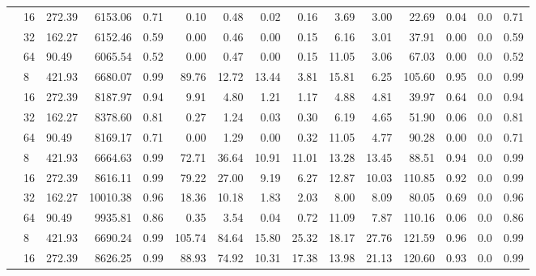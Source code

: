 \begin{table}
\begin{adjustwidth}{-1cm}{}
{\begin{tabular}{lllrrrrrrrrrrrr}
                                 & 16 & 272.39 & 6153.06   & 0.71   & 0.10   & 0.48   & 0.02  & 0.16  & 3.69  & 3.00  & 22.69           & 0.04      & 0.0   & 0.71 \\
                                 & 32 & 162.27 & 6152.46   & 0.59   & 0.00   & 0.46   & 0.00  & 0.15  & 6.16  & 3.01  & 37.91           & 0.00      & 0.0   & 0.59 \\
                                 & 64 & 90.49  & 6065.54   & 0.52   & 0.00   & 0.47   & 0.00  & 0.15  & 11.05 & 3.06  & 67.03           & 0.00      & 0.0   & 0.52 \\
                        \addlinespace
                        48       & 8  & 421.93 & 6680.07   & 0.99   & 89.76  & 12.72  & 13.44 & 3.81  & 15.81 & 6.25  & 105.60          & 0.95      & 0.0   & 0.99 \\
                                 & 16 & 272.39 & 8187.97   & 0.94   & 9.91   & 4.80   & 1.21  & 1.17  & 4.88  & 4.81  & 39.97           & 0.64      & 0.0   & 0.94 \\
                                 & 32 & 162.27 & 8378.60   & 0.81   & 0.27   & 1.24   & 0.03  & 0.30  & 6.19  & 4.65  & 51.90           & 0.06      & 0.0   & 0.81 \\
                                 & 64 & 90.49  & 8169.17   & 0.71   & 0.00   & 1.29   & 0.00  & 0.32  & 11.05 & 4.77  & 90.28           & 0.00      & 0.0   & 0.71 \\
                        \addlinespace
                        96       & 8  & 421.93 & 6664.63   & 0.99   & 72.71  & 36.64  & 10.91 & 11.01 & 13.28 & 13.45 & 88.51           & 0.94      & 0.0   & 0.99 \\
                                 & 16 & 272.39 & 8616.11   & 0.99   & 79.22  & 27.00  & 9.19  & 6.27  & 12.87 & 10.03 & 110.85          & 0.92      & 0.0   & 0.99 \\
                                 & 32 & 162.27 & 10010.38  & 0.96   & 18.36  & 10.18  & 1.83  & 2.03  & 8.00  & 8.09  & 80.05           & 0.69      & 0.0   & 0.96 \\
                                 & 64 & 90.49  & 9935.81   & 0.86   & 0.35   & 3.54   & 0.04  & 0.72  & 11.09 & 7.87  & 110.16          & 0.06      & 0.0   & 0.86 \\
                        \addlinespace
                        192      & 8  & 421.93 & 6690.24   & 0.99   & 105.74 & 84.64  & 15.80 & 25.32 & 18.17 & 27.76 & 121.59          & 0.96      & 0.0   & 0.99 \\
                                 & 16 & 272.39 & 8626.25   & 0.99   & 88.93  & 74.92  & 10.31 & 17.38 & 13.98 & 21.13 & 120.60          & 0.93      & 0.0   & 0.99 \\

\end{tabular}}
\end{adjustwidth}
\end{table}
